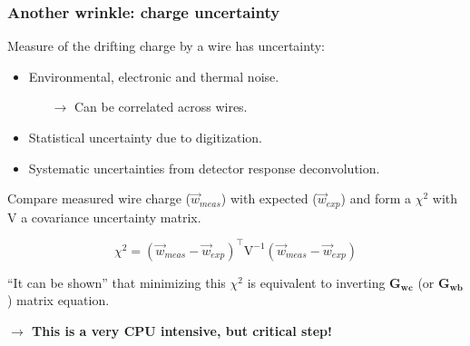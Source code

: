 \documentclass[xcolor=dvipsnames]{beamer}
\begin{document}
\begin{frame}
  \frametitle{Another wrinkle: charge uncertainty}

  Measure of the drifting charge by a wire has uncertainty:
  \begin{itemize}
  \item Environmental, electronic and thermal noise.
    \begin{itemize}\footnotesize
    \item[$\rightarrow$] Can be correlated across wires.
    \end{itemize}
  \item Statistical uncertainty due to digitization.
  \item Systematic uncertainties from detector response deconvolution.
  \end{itemize}
  Compare measured wire charge ($\vec{w}_{meas}$) with expected
  ($\vec{w}_{exp}$) and form a $\chi^2$ with $\mathrm{V}$ a
  covariance uncertainty matrix.
  
  \[\chi^2 = (\vec{w}_{meas}-\vec{w}_{exp})^\intercal\mathrm{V}^{-1} (\vec{w}_{meas}-\vec{w}_{exp})\]

  ``It can be shown'' that minimizing this $\chi^2$ is equivalent to
  inverting $\mathbf{G_{wc}}$ (or $\mathbf{G_{wb}}$) matrix equation.


  \begin{center}
    \textbf{$\rightarrow$ This is a very CPU intensive, but critical step!}
  \end{center}

\end{frame}
\end{document}
